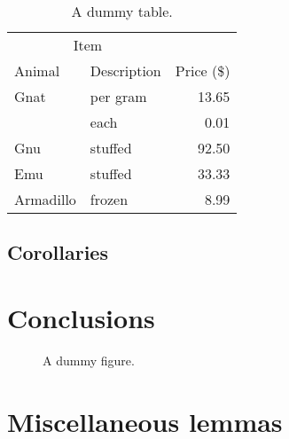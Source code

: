 \documentclass[draft,reqno]{etna}
\begin{document}
\begin{table}
\centering
\caption{A dummy table.}
\begin{tabular}{llr}
\toprule
\multicolumn{2}{c}{Item} \\
\cmidrule(r){1-2}
Animal    & Description & Price (\$) \\
\midrule
Gnat      & per gram    & 13.65      \\
          & each        & 0.01       \\
Gnu       & stuffed     & 92.50      \\
Emu       & stuffed     & 33.33      \\
Armadillo & frozen      & 8.99       \\
\bottomrule
\end{tabular}
\end{table}

\begin{remark}\upshape
  \lipsum[4]
\end{remark}
\begin{example}
  \lipsum[5]
\end{example}
\subsection{Corollaries}
\begin{corollary}
  \lipsum[6]
\end{corollary}
\begin{lemma}
  \lipsum[27]
\end{lemma}

\section{Conclusions}
\lipsum[10-12]

\begin{figure}
  \caption{A dummy figure.}
\end{figure}

\appendix

\section{Miscellaneous lemmas}
\lipsum[13-15]



\end{document}
